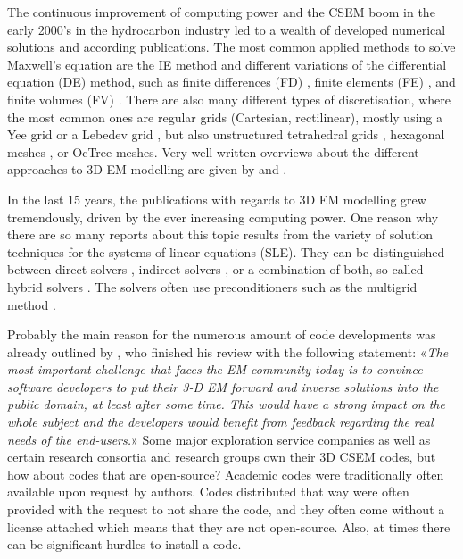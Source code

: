 \documentclass[
    paper,
  ]{geophysics}
\begin{document}
The continuous improvement of computing power and the CSEM boom in the early 2000's in the hydrocarbon industry led to a wealth of developed numerical solutions and according publications.
The most common applied methods to solve Maxwell's equation are the IE method \citep{GJI.74.Raiche, RS.02.Hursan, GEO.06.Zhdanov, GP.10.Tehrani,
CAG.16.Kruglyakov, MGS.17.Kruglyakov} and different variations of the
differential equation (DE) method, such as finite differences (FD)
\citep{IEEE.66.Yee, GEO.93.Wang, RSC.94.Mackie, RS.94.Druskin, GEO.09.Streich, CAG.13.Sommer}, finite elements (FE) \citep{GJI.11.Schwarzbach, GEO.04.Commer, GEO.12.daSilva, GJI.13.Puzyrev, GJI.13.Grayver, SEG.16.Zhang}, and finite volumes (FV) \citep{EM.90.Madsen, ECP.07.Haber, GEO.14.Jahandari, PIER.01.Clemens, GP.06.Mulder}.
There are also many different types of discretisation, where the most common ones are regular grids (Cartesian, rectilinear), mostly using a Yee grid \citep{IEEE.66.Yee} or a Lebedev grid \citep{CMMP.64.Lebedev}, but also unstructured tetrahedral grids \citep{SEG.16.Zhang, CAG.17.Cai}, hexagonal meshes \citep{CAG.14.Cai}, or OcTree meshes\citep{ECP.07.Haber}.
Very well written overviews about the different approaches to 3D EM modelling are given by \cite{SG.05.Avdeev} and \cite{SG.10.Borner}.

In the last 15 years, the publications with regards to 3D EM modelling grew tremendously, driven by the ever increasing computing power.
One reason why there are so many reports about this topic results from the variety of solution techniques for the systems of linear equations (SLE).
They can be distinguished between direct solvers \citep{GEO.09.Streich,
GEO.15.Grayver, GP.14.Chung, GEO.14.Jaysaval, SEG.15.Oh, GJI.18.Wang}, indirect solvers \citep{GP.06.Mulder, GJI.15.Jaysaval}, or a combination of both, so-called hybrid solvers \citep{GEO.18.Liu}.
The solvers often use preconditioners such as the multigrid method \citep{SIAM.02.Aruliah, GP.06.Mulder, GJI.16.Jaysaval}.

Probably the main reason for the numerous amount of code developments was already outlined by \cite{SG.05.Avdeev}, who finished his review with the following statement: «\emph{The most important challenge that faces the EM community today is to convince software developers to put their 3-D EM forward and inverse solutions into the public domain, at least after some time. This would have a strong impact on the whole subject and the developers would benefit from feedback regarding the real needs of the end-users.}»
Some major exploration service companies as well as certain research consortia and research groups own their 3D CSEM codes, but how about codes that are open-source?
Academic codes were traditionally often available upon request by authors.
Codes distributed that way were often provided with the request to not share the code, and they often come without a license attached which means that they are not open-source.
Also, at times there can be significant hurdles to install a code.
\end{document}
